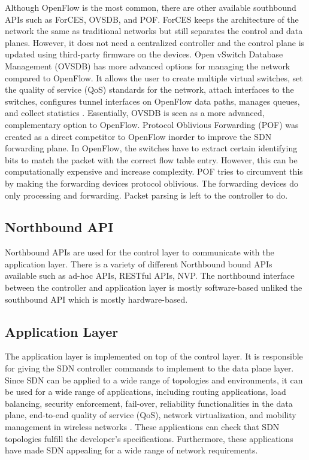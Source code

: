 \documentclass[conference]{IEEEtran}
\begin{document}
Although OpenFlow is the most common, there are other available southbound APIs such as ForCES, OVSDB, and POF. ForCES keeps the architecture of the network the same as traditional networks but still separates the control and data planes. However, it does not need  a centralized controller and the control plane is updated using third-party firmware on the devices.
Open vSwitch Database Management (OVSDB) has more advanced options for managing the network compared to OpenFlow. It allows the user to create multiple virtual switches, set the quality of service (QoS) standards for the network, attach interfaces to the switches, configures tunnel interfaces on OpenFlow data paths, manages queues, and collect statistics \cite{kreutz2014software}. Essentially, OVSDB is seen as a more advanced, complementary option to OpenFlow.
Protocol Oblivious Forwarding (POF) was created as a direct competitor to OpenFlow inorder to improve the SDN forwarding plane. In OpenFlow, the switches have to extract certain identifying bits to match the packet with the correct flow table entry. However, this can be computationally expensive and increase complexity. POF tries to circumvent this by making the forwarding devices protocol oblivious. The forwarding devices do only processing and forwarding. Packet parsing is left to the controller to do. 




\subsection{Northbound API}

Northbound APIs are  used for the control layer to communicate with the application layer. There is a variety of different Northbound bound APIs available such as ad-hoc APIs, RESTful APIs, NVP\cite{haggag2021network, haggag2019network, humernbrum2014using}. The northbound interface between the controller and application layer is mostly software-based unliked the southbound API which is mostly hardware-based. 

\subsection{Application Layer}

The application layer is implemented on top of the control layer. It is responsible for giving the SDN controller commands to implement to the data plane layer. Since SDN can be applied to a wide range of topologies and environments, it can be used for a wide range of applications, including routing applications, load balancing, security enforcement, fail-over, reliability functionalities in the data plane, end-to-end quality of service (QoS), network virtualization, and mobility management in wireless networks \cite{kreutz2014software}. These applications can check that SDN topologies fulfill the developer's specifications. Furthermore, these applications have made SDN appealing for a wide range of network requirements.
\end{document}
